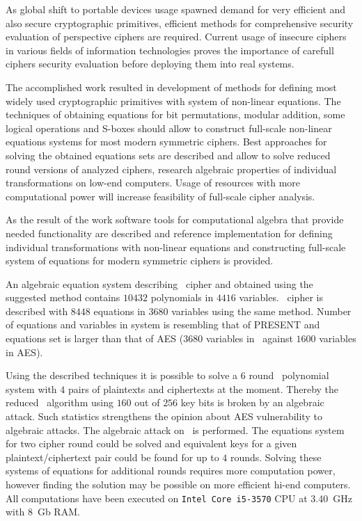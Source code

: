 
\label{sec:conclusions}

As global shift to portable devices usage spawned demand for very efficient and
also secure cryptographic primitives, efficient methods for comprehensive
security evaluation of perspective ciphers are required. Current usage of
insecure ciphers in various fields of information technologies proves the
importance of carefull ciphers security evaluation before deploying them into
real systems.

The accomplished work resulted in development of methods for defining most
widely used cryptographic primitives with system of non-linear equations. The
techniques of obtaining equations for bit permutations, modular addition, some
logical operations and S-boxes should allow to construct full-scale non-linear
equations systems for most modern symmetric ciphers. Best approaches for solving
the obtained equations sets are described and allow to solve reduced round
versions of analyzed ciphers, research algebraic properties of individual
transformations on low-end computers. Usage of resources with more
computational power will increase feasibility of full-scale cipher analysis.

As the result of the work software tools for computational algebra that provide
needed functionality are described and reference implementation for defining
individual transformations with non-linear equations and constructing full-scale
system of equations for modern symmetric ciphers is provided.

An algebraic equation system describing \gost\ cipher and obtained using the
suggested method contains $10432$ polynomials in $4416$ variables. \misty\
cipher is described with $8448$ equations in $3680$ variables using the same
method. Number of equations and variables in \gost system is resembling 
that of PRESENT and \misty equations set is larger than that of AES ($3680$
variables in \misty\ against $1600$ variables in AES).

Using the described techniques it is possible to solve a $6$ round
\gost\ polynomial system with $4$ pairs of plaintexts and ciphertexts at the
moment. Thereby the reduced \gost\ algorithm using $160$ out of $256$ key bits is
broken by an algebraic attack. Such statistics strengthens the opinion about
AES vulnerability to algebraic attacks. The
algebraic attack on \misty\ is performed. The equations system for two cipher
round could be solved and equivalent keys for a given
\mbox{plaintext/ciphertext} pair could be found for up to $4$ rounds.
Solving these systems of equations for additional rounds requires more
computation power, however finding the solution may be possible on more
efficient hi-end computers. All computations have been executed on 
 \verb+Intel Core i5-3570+ CPU at 3.40~GHz with 8~Gb RAM.

